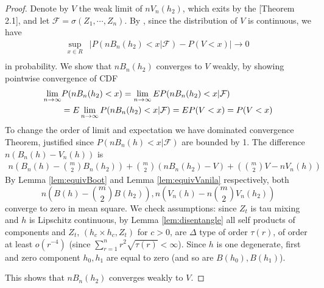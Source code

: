 \begin{proof}
Denote by $V$ the weak limit of $n V_n(h_2)$, which exits by the  \cite{leucht_dependent_2013}[Theorem 2.1],  and let $\mathcal{F} = \sigma(Z_1, \cdots , Z_n)$.   By \citet[Theorem 3.1]{leucht_dependent_2013}, since the distribution of  $V$ is continuous, we have 
\begin{align*}
\sup_{x \in R} &\left| P(nB_n(h_2)  < x|\mathcal{F}) -   P(V<x) \right| \to 0  \\
\end{align*}
in probability. We show that $nB_n(h_2)$ converges  to $V$ weakly, by showing  pointwise convergence  of CDF  
\begin{align*}
 \lim_{n \to \infty} &P(nB_n(h_2)  < x) =  \lim_{n \to \infty} E P(nB_n(h_2)  < x|\mathcal{F}) \\
 &=  E  \lim_{n \to \infty} P(nB_n(h_2)  < x|\mathcal{F})  = E P(V<x) =P(V<x) 
\end{align*}
To change the order of limit and expectation we have dominated convergence Theorem, justified since  $P(nB_n(h)  < x|\mathcal{F})$  are bounded by 1.
The difference $n(B_n(h) - V_n(h))$ is
\begin{align*}
 n \left (B_n(h) -  \binom m 2 B_n(h_2) \right) + \binom m 2 \left (n B_n(h_2) -V\right)+ \left (\binom m 2 V - nV_n(h)\right)
 \end{align*}
By  Lemma \ref{lem:equivBoot} and Lemma \ref{lem:equivVanila} respectively, both 
$$n (B(h) -   \binom m 2  B(h_2)) , n (V_n(h) - n \binom m 2 V_n(h_2))$$
converge to zero in mean square. We check assumptions: since $Z_t$ is tau mixing and $h$ is Lipschitz continuous, by Lemma \ref{lem:disentangle} all self products of components and $Z_t$, $(h_c \times h_c,Z_t)$ for $c>0$, are $\varDelta$ type of order $\tau(r)$, of order at least  $o(r^{-4})$ (since $\sum_{r=1}^n r^2 \sqrt{\tau(r)} < \infty$). Since $h$ is one degenerate,  first and zero component $h_0,h_1$ are equal to zero (and so are $B(h_0),B(h_1)$).  

This shows that $nB_n(h_2)$ converges weakly to $V$. 
\end{proof}  

